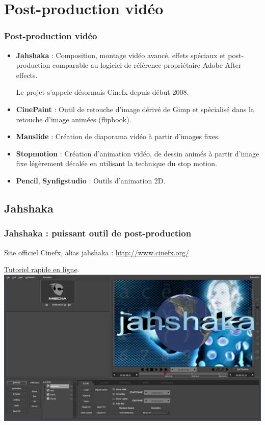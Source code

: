 \section{Post-production vidéo}
\begin{frame}
 \frametitle{Post-production vidéo}
  
  \begin{itemize}
\item \textbf{Jahshaka} : Composition, montage vidéo avancé, effets spéciaux et post-production comparable au logiciel de référence propriétaire Adobe After effects. 

Le projet s'appele désormais Cinefx depuis début 2008.

 \item \textbf{CinePaint} : Outil de retouche d'image dérivé de Gimp et spécialisé dans la retouche d'image animées (flipbook).
\item \textbf{Manslide} : Création de diaporama vidéo à partir d'images fixes.
\item \textbf{Stopmotion} : Création d'animation vidéo, de dessin animés à partir d'image fixe légèrement décalée en utilisant la technique du stop motion.
\item \textbf{Pencil}, 	\textbf{Synfigstudio} : Outils d'animation 2D.
 \end{itemize}
\end{frame}

\subsection{Jahshaka}
\begin{frame}
\frametitle{Jahshaka : puissant outil de post-production}
Site officiel Cinefx, alias jahshaka : \href{http://www.cinefx.org/}{http://www.cinefx.org/}

\href{http://download.tuxfamily.org/lprod/tutoriels/tutoriel_jahshaka_niv1_debutant.pdf}{Tutoriel rapide en ligne}.
\includegraphics[scale=0.20]{ressources/jahshaka.png}
\end{frame}

